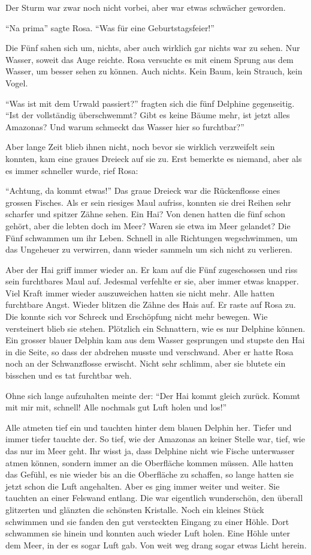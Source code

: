 Der Sturm war zwar noch nicht vorbei, aber war etwas schwächer geworden. 

\enquote{Na prima} sagte Rosa. \enquote{Was für eine Geburtstagsfeier!}

Die Fünf sahen sich um, nichts, aber auch wirklich gar nichts war zu sehen. Nur Wasser, soweit das Auge reichte. Rosa versuchte es mit einem Sprung aus dem Wasser, um besser sehen zu können. Auch nichts. Kein Baum, kein Strauch, kein Vogel.

\enquote{Was ist mit dem Urwald passiert?} fragten sich die fünf Delphine gegenseitig. \enquote{Ist der vollständig überschwemmt? Gibt es keine Bäume mehr, ist jetzt alles Amazonas? Und warum schmeckt das Wasser hier so furchtbar?} 

Aber lange Zeit blieb ihnen nicht, noch bevor sie wirklich verzweifelt sein konnten, kam eine graues Dreieck auf sie zu. Erst bemerkte es niemand, aber als es immer schneller wurde, rief Rosa:

\enquote{Achtung, da kommt etwas!} Das graue Dreieck war die Rückenflosse eines grossen Fisches. Als er sein riesiges Maul aufriss, konnten sie drei Reihen sehr scharfer und spitzer Zähne sehen. Ein Hai? Von denen hatten die fünf schon gehört, aber die lebten doch im Meer? Waren sie etwa im Meer gelandet? Die Fünf schwammen um ihr Leben. Schnell in alle Richtungen wegschwimmen, um das Ungeheuer zu verwirren, dann wieder sammeln um sich nicht zu verlieren. 

Aber der Hai griff immer wieder an. Er kam auf die Fünf zugeschossen und riss sein furchtbares Maul auf. Jedesmal verfehlte er sie, aber immer etwas knapper. Viel Kraft immer wieder auszuweichen hatten sie nicht mehr. Alle hatten furchtbare Angst. Wieder blitzen die Zähne des Hais auf. Er raste auf Rosa zu. Die konnte sich vor Schreck und Erschöpfung nicht mehr bewegen. Wie versteinert blieb sie stehen. Plötzlich ein Schnattern, wie es nur Delphine können. Ein grosser blauer Delphin kam aus dem Wasser gesprungen und stupste den Hai in die Seite, so dass der abdrehen musste und verschwand. Aber er hatte Rosa noch an der Schwanzflosse erwischt. Nicht sehr schlimm, aber sie blutete ein bisschen und es tat furchtbar weh.

Ohne sich lange aufzuhalten meinte der: \enquote{Der Hai kommt gleich zurück. Kommt mit mir mit, schnell! Alle nochmals gut Luft holen und los!}

Alle atmeten tief ein und tauchten hinter dem blauen Delphin her. Tiefer und immer tiefer tauchte der. So tief, wie der Amazonas an keiner Stelle war, tief, wie das nur im Meer geht. Ihr wisst ja, dass Delphine nicht wie Fische unterwasser atmen können, sondern immer an die Oberfläche kommen müssen. Alle hatten das Gefühl, es nie wieder bis an die Oberfläche zu schaffen, so lange hatten sie jetzt schon die Luft angehalten. Aber es ging immer weiter und weiter. Sie tauchten an einer Felswand entlang. Die war eigentlich wunderschön, den überall glitzerten und glänzten die schönsten Kristalle. Noch ein kleines Stück schwimmen und sie fanden den gut versteckten Eingang zu einer Höhle. Dort schwammen sie hinein und konnten auch wieder Luft holen. Eine Höhle unter dem Meer, in der es sogar Luft gab. Von weit weg drang sogar etwas Licht herein.

